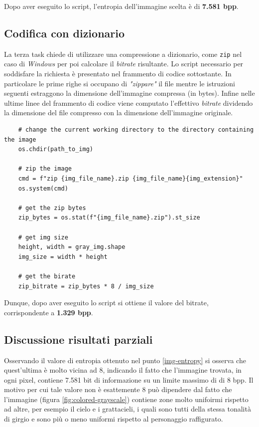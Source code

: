 \noindent Dopo aver eseguito lo script, l'entropia dell'immagine scelta è di \textbf{7.581 bpp}.



\vspace{15px}\subsection{Codifica con dizionario} \label{dictionary-coding}
La terza task chiede di utilizzare una compressione a dizionario, come \texttt{zip} nel caso di \textsl{Windows} per poi calcolare il \textsl{bitrate} risultante. Lo script necessario per soddisfare la richiesta è presentato nel frammento di codice sottostante. In particolare le prime righe si occupano di \textsl{"zippare"} il file mentre le istruzioni seguenti estraggono la dimensione dell'immagine compressa (in bytes). Infine nelle ultime linee del frammento di codice viene computato l'effettivo \textsl{bitrate} dividendo la dimensione del file compresso con la dimensione dell'immagine originale.

\begin{lstlisting}
    # change the current working directory to the directory containing the image
    os.chdir(path_to_img)

    # zip the image
    cmd = f"zip {img_file_name}.zip {img_file_name}{img_extension}"
    os.system(cmd)
    
    # get the zip bytes
    zip_bytes = os.stat(f"{img_file_name}.zip").st_size

    # get img size
    height, width = gray_img.shape
    img_size = width * height

    # get the birate
    zip_bitrate = zip_bytes * 8 / img_size 
\end{lstlisting}

\noindent Dunque, dopo aver eseguito lo script si ottiene il valore del bitrate, corrispondente a \textbf{1.329 bpp}. 



\vspace{15px}\subsection{Discussione risultati parziali}
Osservando il valore di entropia ottenuto nel punto \ref{img-entropy} si osserva che quest'ultima è molto vicina ad 8, indicando il fatto che l'immagine trovata, in ogni pixel, contiene 7.581 bit di  informazione su un limite massimo di di 8 bpp. Il motivo per cui tale valore non è esattemente 8 può dipendere dal fatto che l'immagine (figura \ref{fig:colored-grayscale}) contiene zone molto unifoirmi rispetto ad altre, per esempio il cielo e i grattacieli, i quali sono tutti della stessa tonalità di girgio e sono più o meno uniformi rispetto al personaggio raffigurato.

